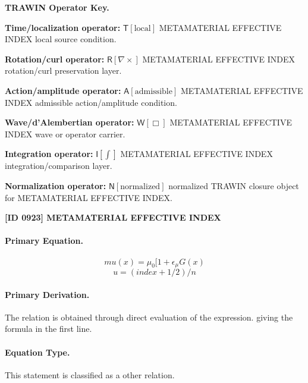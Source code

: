 \par\vspace{0.45\baselineskip}
\noindent\begin{minipage}[t]{\linewidth}
\begingroup
\small
\raggedright
\textbf{TRAWIN Operator Key.}\par
\noindent\textbf{Time/localization operator:} $\mathsf{T}\!\left[\mathrm{local}\right]$ METAMATERIAL EFFECTIVE INDEX local source condition.\par
\noindent\textbf{Rotation/curl operator:} $\mathsf{R}\!\left[\nabla\times\right]$ METAMATERIAL EFFECTIVE INDEX rotation/curl preservation layer.\par
\noindent\textbf{Action/amplitude operator:} $\mathsf{A}\!\left[\mathrm{admissible}\right]$ METAMATERIAL EFFECTIVE INDEX admissible action/amplitude condition.\par
\noindent\textbf{Wave/d'Alembertian operator:} $\mathsf{W}\!\left[\Box\right]$ METAMATERIAL EFFECTIVE INDEX wave or operator carrier.\par
\noindent\textbf{Integration operator:} $\mathsf{I}\!\left[\int\right]$ METAMATERIAL EFFECTIVE INDEX integration/comparison layer.\par
\noindent\textbf{Normalization operator:} $\mathsf{N}\!\left[\mathrm{normalized}\right]$ normalized TRAWIN closure object for METAMATERIAL EFFECTIVE INDEX.\par
\endgroup
\end{minipage}

\clearpage
\noindent\textbf{[ID 0923] METAMATERIAL EFFECTIVE INDEX}\par
\vspace{0.35em}
\paragraph{Primary Equation.}
\[
mu(x)=\mu_{0}[1+\epsilon_{\mu}G(x)
\]
\[
u = (index + 1/2)/n
\]

\paragraph{Primary Derivation.}
The relation is obtained through direct evaluation of the expression. giving the formula in the first line.
\paragraph{Equation Type.}
This statement is classified as a other relation.

